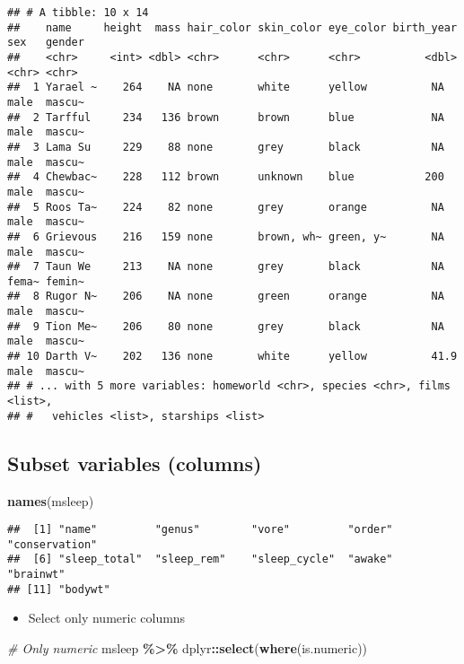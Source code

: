 \documentclass[
]{book}
\newenvironment{Shaded}{\begin{snugshade}}{\end{snugshade}}
\newcommand{\CommentTok}[1]{\textcolor[rgb]{0.56,0.35,0.01}{\textit{#1}}}
\newcommand{\KeywordTok}[1]{\textcolor[rgb]{0.13,0.29,0.53}{\textbf{#1}}}
\newcommand{\NormalTok}[1]{#1}
\newcommand{\OperatorTok}[1]{\textcolor[rgb]{0.81,0.36,0.00}{\textbf{#1}}}
\newcommand{\StringTok}[1]{\textcolor[rgb]{0.31,0.60,0.02}{#1}}
\providecommand{\tightlist}{%
  \setlength{\itemsep}{0pt}\setlength{\parskip}{0pt}}
\begin{document}
\begin{verbatim}
## # A tibble: 10 x 14
##    name     height  mass hair_color skin_color eye_color birth_year sex   gender
##    <chr>     <int> <dbl> <chr>      <chr>      <chr>          <dbl> <chr> <chr> 
##  1 Yarael ~    264    NA none       white      yellow          NA   male  mascu~
##  2 Tarfful     234   136 brown      brown      blue            NA   male  mascu~
##  3 Lama Su     229    88 none       grey       black           NA   male  mascu~
##  4 Chewbac~    228   112 brown      unknown    blue           200   male  mascu~
##  5 Roos Ta~    224    82 none       grey       orange          NA   male  mascu~
##  6 Grievous    216   159 none       brown, wh~ green, y~       NA   male  mascu~
##  7 Taun We     213    NA none       grey       black           NA   fema~ femin~
##  8 Rugor N~    206    NA none       green      orange          NA   male  mascu~
##  9 Tion Me~    206    80 none       grey       black           NA   male  mascu~
## 10 Darth V~    202   136 none       white      yellow          41.9 male  mascu~
## # ... with 5 more variables: homeworld <chr>, species <chr>, films <list>,
## #   vehicles <list>, starships <list>
\end{verbatim}

\hypertarget{subset-variables-columns}{%
\subsection{Subset variables (columns)}\label{subset-variables-columns}}

\begin{Shaded}
\begin{Highlighting}[]
\KeywordTok{names}\NormalTok{(msleep)}
\end{Highlighting}
\end{Shaded}

\begin{verbatim}
##  [1] "name"         "genus"        "vore"         "order"        "conservation"
##  [6] "sleep_total"  "sleep_rem"    "sleep_cycle"  "awake"        "brainwt"     
## [11] "bodywt"
\end{verbatim}

\begin{itemize}
\tightlist
\item
  Select only numeric columns
\end{itemize}

\begin{Shaded}
\begin{Highlighting}[]
\CommentTok{\# Only numeric}
\NormalTok{msleep }\OperatorTok{\%\textgreater{}\%}
\StringTok{  }\NormalTok{dplyr}\OperatorTok{::}\KeywordTok{select}\NormalTok{(}\KeywordTok{where}\NormalTok{(is.numeric))}
\end{Highlighting}
\end{Shaded}
\end{document}
